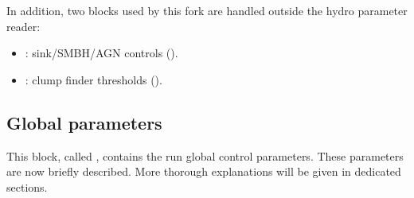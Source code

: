 In addition, two blocks used by this fork are handled outside the hydro
parameter reader:

\begin{itemize}
   \item {}: sink/SMBH/AGN controls
   ().
   \item {}: clump finder thresholds
   ().
\end{itemize}

\clearpage
\subsection{Global parameters}

This block, called , contains the run global
control parameters. These parameters are now briefly described. More
thorough explanations will be given in dedicated sections.

